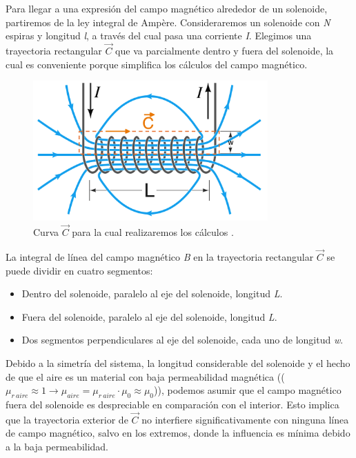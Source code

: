 Para llegar a una expresión del campo magnético alrededor de un solenoide, partiremos de la ley integral de Ampère. Consideraremos un solenoide con \textit{N} espiras y longitud \textit{l}, a través del cual pasa una corriente \textit{I}. Elegimos una trayectoria rectangular \(\vec{C}\) que va parcialmente dentro y fuera del solenoide, la cual es conveniente porque simplifica los cálculos del campo magnético.

\begin{figure}[H]
    \centering %
    \includegraphics[width=9cm]{FigurasMemoria/integralampere.png}
    \caption{Curva \textbf{\(\vec{C}\)} para la cual realizaremos los cálculos \citep{artpictures2023}.}
    \label{fig:integralampere} %
\end{figure}

La integral de línea del campo magnético \textit{B} en la trayectoria rectangular \(\vec C\) se puede dividir en cuatro segmentos:
\begin{itemize}
    \item Dentro del solenoide, paralelo al eje del solenoide, longitud \textit{L}.
    \item Fuera del solenoide, paralelo al eje del solenoide, longitud \textit{L}.
    \item Dos segmentos perpendiculares al eje del solenoide, cada uno de longitud \textit{w}.
\end{itemize}

Debido a la simetría del sistema, la longitud considerable del solenoide y el hecho de que el aire es un material con baja permeabilidad magnética ((\(\mu_{r~aire}\approx1\rightarrow\mu_{aire}=\mu_{r~aire}\cdot\mu_0\approx\mu_0\))), podemos asumir que el campo magnético fuera del solenoide es despreciable en comparación con el interior. Esto implica que la trayectoria exterior de \(\vec C\) no interfiere significativamente con ninguna línea de campo magnético, salvo en los extremos, donde la influencia es mínima debido a la baja permeabilidad.

